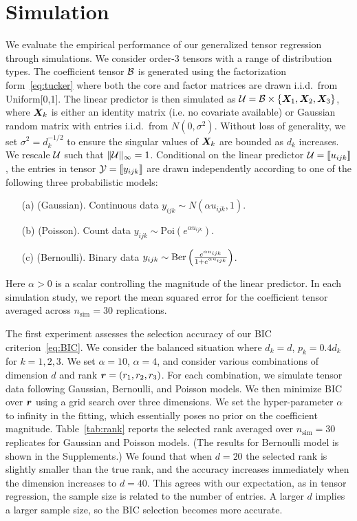 \documentclass[twoside]{article}
\theoremstyle{plain}
\theoremstyle{definition}
\begin{document}
\section{Simulation}\label{sec:simulation}
We evaluate the empirical performance of our generalized tensor regression through simulations. We consider order-3 tensors with a range of distribution types. The coefficient tensor $\mathcal{B}$ is generated using the factorization form~\eqref{eq:tucker} where both the core and factor matrices are drawn i.i.d.\ from Uniform[0,1]. The linear predictor is then simulated as $\mathcal{U}=\mathcal{B}\times\{\bm X_1,\bm X_2,\bm X_3\}$, where $\bm X_k$ is either an identity matrix (i.e. no covariate available) or Gaussian random matrix with entries i.i.d.\ from $N(0,\sigma^2)$. Without loss of generality, we set $\sigma^2=d_k^{-1/2}$ to ensure the singular values of $\bm X_k$ are bounded as $d_k$ increases. We rescale $\mathcal{U}$ such that $\lVert\mathcal{U}\rVert_\infty=1$. Conditional on the linear predictor $\mathcal{U}=\llbracket u_{ijk} \rrbracket$, the entries in tensor $\mathcal{Y}=\llbracket y_{ijk} \rrbracket$ are drawn independently according to one of the following three probabilistic models:

\begin{enumerate}[itemsep=0pt,topsep=0pt]
\item[(a)] (Gaussian). Continuous data $y_{ijk}\sim N\left(\alpha u_{ijk}, 1\right)$.
\item[(b)] (Poisson). Count data $y_{ijk}\sim\text{Poi}\left( e^{\alpha u_{ijk}}\right)$.
\item[(c)] (Bernoulli). Binary data $y_{ijk}\sim \text{Ber}\left( {e^{\alpha u_{ijk}} \over 1+e^{\alpha u_{ijk}}}\right)$.
\end{enumerate}
Here $\alpha>0$ is a scalar controlling the magnitude of the linear predictor. In each simulation study, we report the mean squared error for the coefficient tensor averaged across $n_{\text{sim}}=30$ replications. 

The first experiment assesses the selection accuracy of our BIC criterion~\eqref{eq:BIC}. We consider the balanced situation where $d_k=d$, $p_k=0.4d_k$ for $k=1,2,3$. We set $\alpha=10$, $\alpha=4$, and consider various combinations of dimension $d$ and rank $\bm{r}=(r_1,r_2,r_3)$. For each combination, we simulate tensor data following Gaussian, Bernoulli, and Poisson models. We then minimize BIC over $\bm{r}$ using a grid search over three dimensions. We set the hyper-parameter $\alpha$ to infinity in the fitting, which essentially poses no prior on the coefficient magnitude. Table~\ref{tab:rank} reports the selected rank averaged over $n_{\text{sim}}=30$ replicates for Gaussian and Poisson models. (The results for Bernoulli model is shown in the Supplements.) We found that when $d=20$ the selected rank is slightly smaller than the true rank, and the accuracy increases immediately when the dimension increases to $d=40$. This agrees with our expectation, as in tensor regression, the sample size is related to the number of entries. A larger $d$ implies a larger sample size, so the BIC selection becomes more accurate. 
\end{document}
